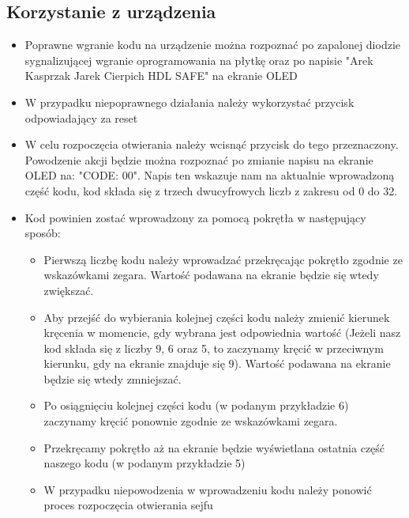 \documentclass[12pt] {article}
\begin{document}
\subsection{Korzystanie z urządzenia}
\begin{itemize}

\item Poprawne wgranie kodu na urządzenie można rozpoznać po zapalonej diodzie sygnalizującej  wgranie oprogramowania na płytkę oraz po napisie "Arek Kasprzak Jarek Cierpich HDL SAFE" na ekranie OLED

\item W przypadku niepoprawnego działania należy wykorzystać przycisk odpowiadający za reset

\item W celu rozpoczęcia otwierania należy wcisnąć przycisk do tego przeznaczony. Powodzenie akcji będzie można rozpoznać po zmianie napisu na ekranie OLED na: "CODE: 00". Napis ten wskazuje nam na aktualnie wprowadzoną część kodu, kod składa się z trzech dwucyfrowych liczb z zakresu od 0 do 32.

\newpage
\item Kod powinien zostać wprowadzony za pomocą pokrętła w następujący sposób:
\begin{itemize}
\item Pierwszą liczbę kodu należy wprowadzać przekręcając pokrętło zgodnie ze wskazówkami zegara. Wartość podawana na ekranie będzie się wtedy zwiększać.
\item Aby przejść do wybierania kolejnej części kodu należy zmienić kierunek kręcenia w momencie, gdy wybrana jest odpowiednia wartość (Jeżeli nasz kod składa się z liczby 9, 6 oraz 5, to zaczynamy kręcić w przeciwnym kierunku, gdy na ekranie znajduje się 9). Wartość podawana na ekranie będzie się wtedy zmniejszać.
\item Po osiągnięciu kolejnej części kodu (w podanym przykładzie 6) zaczynamy kręcić ponownie zgodnie ze wskazówkami zegara.
\item Przekręcamy pokrętło aż na ekranie będzie wyświetlana ostatnia część naszego kodu (w podanym przykładzie 5)
\item W przypadku niepowodzenia w wprowadzeniu kodu należy ponowić proces rozpoczęcia otwierania sejfu
\end{itemize}


\end{itemize}
\end{document}
